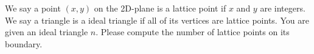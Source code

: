 We say a point $(x,y)$ on the 2D-plane is a lattice point if $x$ and $y$ are integers.
We say a triangle is a ideal triangle if all of its vertices are lattice points.
You are given an ideal triangle $n$. Please compute the number of lattice points on its boundary.
